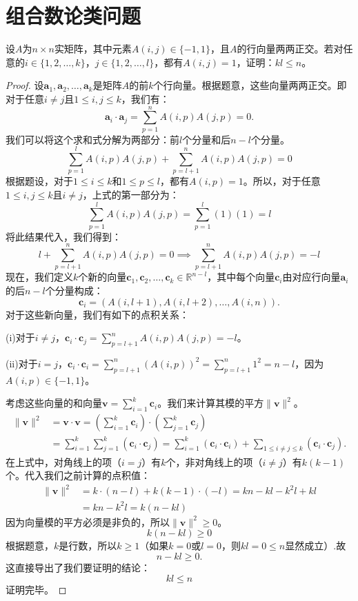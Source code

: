 \documentclass[../../main.tex]{subfiles}
\begin{document}
\section{组合数论类问题}

\begin{example}
设$A$为$n \times n$实矩阵，其中元素$A(i,j) \in \{-1,1\}$，且$A$的行向量两两正交。若对任意的$i \in \{1,2,\ldots,k\}$，$j \in \{1,2,\ldots,l\}$，都有$A(i,j) = 1$，证明：$kl \leqslant n$。
\end{example}
\begin{proof}
设$\mathbf{a}_1, \mathbf{a}_2, \ldots, \mathbf{a}_k$是矩阵$A$的前$k$个行向量。根据题意，这些向量两两正交。即对于任意$i \neq j$且$1 \leqslant i, j \leqslant k$，我们有：
\[
\mathbf{a}_i \cdot \mathbf{a}_j = \sum_{p=1}^n A(i, p)A(j, p) = 0.
\]
我们可以将这个求和式分解为两部分：前$l$个分量和后$n - l$个分量。
\[
\sum_{p=1}^l A(i, p)A(j, p) + \sum_{p=l+1}^n A(i, p)A(j, p) = 0 
\]
根据题设，对于$1 \leqslant i \leqslant k$和$1 \leqslant p \leqslant l$，都有$A(i, p) = 1$。所以，对于任意$1 \leqslant i, j \leqslant k$且$i \neq j$，上式的第一部分为：
\[
\sum_{p=1}^l A(i, p)A(j, p) = \sum_{p=1}^l (1)(1) = l 
\]
将此结果代入，我们得到：
\[
l + \sum_{p=l+1}^n A(i, p)A(j, p) = 0 \implies \sum_{p=l+1}^n A(i, p)A(j, p) = -l 
\]
现在，我们定义$k$个新的向量$\mathbf{c}_1, \mathbf{c}_2, \ldots, \mathbf{c}_k \in \mathbb{R}^{n - l}$，其中每个向量$\mathbf{c}_i$由对应行向量$\mathbf{a}_i$的后$n - l$个分量构成：
\[
\mathbf{c}_i = (A(i, l + 1), A(i, l + 2), \ldots, A(i, n)).
\]
对于这些新向量，我们有如下的点积关系：

(i)对于$i \neq j$，$\mathbf{c}_i \cdot \mathbf{c}_j = \sum_{p=l+1}^n A(i, p)A(j, p) = -l$。

(ii)对于$i = j$，$\mathbf{c}_i \cdot \mathbf{c}_i = \sum_{p=l+1}^n (A(i, p))^2 = \sum_{p=l+1}^n 1^2 = n - l$，因为$A(i, p) \in \{-1, 1\}$。

考虑这些向量的和向量$\mathbf{v} = \sum_{i=1}^k \mathbf{c}_i$。我们来计算其模的平方$\|\mathbf{v}\|^2$。
\begin{align*}
\|\mathbf{v}\|^2 &= \mathbf{v} \cdot \mathbf{v} = \left( \sum_{i=1}^k \mathbf{c}_i \right) \cdot \left( \sum_{j=1}^k \mathbf{c}_j \right) \\
&= \sum_{i=1}^k \sum_{j=1}^k (\mathbf{c}_i \cdot \mathbf{c}_j)= \sum_{i=1}^k (\mathbf{c}_i \cdot \mathbf{c}_i) + \sum_{1 \leqslant i \neq j \leqslant k} (\mathbf{c}_i \cdot \mathbf{c}_j).
\end{align*}
在上式中，对角线上的项（$i = j$）有$k$个，非对角线上的项（$i \neq j$）有$k(k - 1)$个。代入我们之前计算的点积值：
\begin{align*}
\|\mathbf{v}\|^2 &= k \cdot (n - l) + k(k - 1) \cdot (-l) = kn - kl - k^2 l + kl \\
&= kn - k^2 l = k(n - kl)
\end{align*}
因为向量模的平方必须是非负的，所以$\|\mathbf{v}\|^2 \geqslant 0$。
\[
k(n - kl) \geqslant 0
\]
根据题意，$k$是行数，所以$k \geqslant 1$（如果$k = 0$或$l = 0$，则$kl = 0 \leqslant n$显然成立）.故
\[
n - kl \geqslant 0.
\]
这直接导出了我们要证明的结论：
\[
kl \leqslant n \label{eq:12}
\]
证明完毕。

\end{proof}
\end{document}
